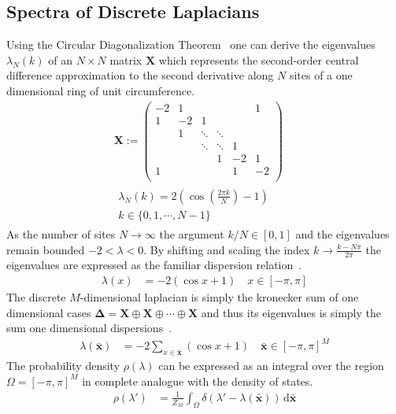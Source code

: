 \documentclass{article}[12pt]
\numberwithin{equation}{section}
\begin{document}
\subsection{Spectra of Discrete Laplacians}
Using the Circular Diagonalization Theorem~\cite{} one can derive the
eigenvalues $\lambda_N(k)$ of an $N\times N$ matrix $\mathbf X$ which
represents the second-order central difference approximation to the
second derivative along $N$ sites of a one dimensional ring of unit
circumference.
\begin{align}
  \mathbf X :=
  \begin{pmatrix}
    -2 & 1 &  &  &  & 1 \\
    1 & -2 & 1 &  &  &  \\
    & 1 & \ddots & \ddots &  & \\
    & & \ddots & \ddots & 1 & \\
    & & & 1 & -2 & 1 \\
    1 & & & & 1 & -2 \\
  \end{pmatrix}\\
  \begin{matrix}
    \lambda_N(k)=2\left(\cos\left(\frac{2\pi k}{N}\right)-1\right) \\
    k\in\{0,1,\cdots,N-1\}
  \end{matrix}
  \qquad
\end{align}
As the number of sites $N\rightarrow\infty$ the argument $k/N\in[0,1]$
and the eigenvalues remain bounded $-2<\lambda<0$. By shifting and scaling
the index $k\rightarrow\frac{k-N\pi}{2\pi}$ the eigenvalues are expressed as
the familiar dispersion relation~\cite{}.
\begin{align}
  \lambda(x)&=
  -2\left(\cos x+1\right)
  \quad x\in[-\pi,\pi]
\end{align}
The discrete $M$-dimensional laplacian is simply the kronecker sum of one
dimensional cases $\mathbf\Delta=\mathbf X\oplus\mathbf X\oplus\cdots\oplus\mathbf X$
and thus its eigenvalues is simply the sum one dimensional dispersions~\cite{}.
\begin{align}
  \lambda(\mathbf{\bar x})&=
  -2\sum_{x\in\mathbf{\bar x}}\left(\cos x+1\right)
  \quad \mathbf{\bar x}\in[-\pi,\pi]^M
\end{align}
The probability density $\rho(\lambda)$ can be expressed as an integral
over the region $\Omega=[-\pi,\pi]^M$ in complete analogue with the
density of states.
\begin{align*}
  \rho(\lambda')&=\frac{1}{Z_M}\int_{\Omega}\!\delta(\lambda'-\lambda(\mathbf{\bar x}))\,\mathrm{d}\mathbf{\bar x}
\end{align*}
\end{document}
